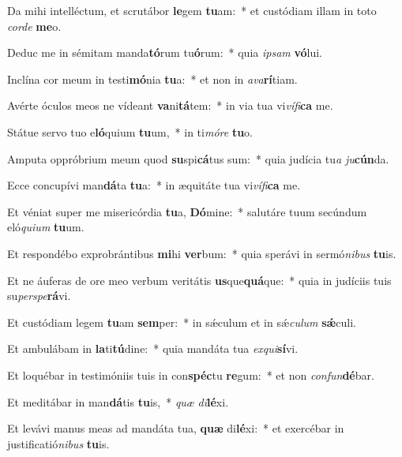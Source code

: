 \item Da mihi intelléctum, et scrutábor \textbf{le}gem \textbf{tu}am:~* et custódiam illam in toto \textit{cor}\textit{de} \textbf{me}o.
\item Deduc me in sémitam manda\textbf{tó}rum tu\textbf{ó}rum:~* quia \textit{ip}\textit{sam} \textbf{vó}lui.
\item Inclína cor meum in testi\textbf{mó}nia \textbf{tu}a:~* et non in \textit{a}\textit{va}\textbf{rí}tiam.
\item Avérte óculos meos ne vídeant \textbf{va}ni\textbf{tá}tem:~* in via tua vi\textit{ví}\textit{fi}\textbf{ca} me.
\item Státue servo tuo e\textbf{ló}quium \textbf{tu}um,~* in ti\textit{mó}\textit{re} \textbf{tu}o.
\item Amputa oppróbrium meum quod \textbf{su}spi\textbf{cá}tus sum:~* quia judícia tu\textit{a} \textit{ju}\textbf{cún}da.
\item Ecce concupívi man\textbf{dá}ta \textbf{tu}a:~* in æquitáte tua vi\textit{ví}\textit{fi}\textbf{ca} me.
\item Et véniat super me misericórdia \textbf{tu}a, \textbf{Dó}mine:~* salutáre tuum secúndum eló\textit{qui}\textit{um} \textbf{tu}um.
\item Et respondébo exprobrántibus \textbf{mi}hi \textbf{ver}bum:~* quia sperávi in sermó\textit{ni}\textit{bus} \textbf{tu}is.
\item Et ne áuferas de ore meo verbum veritátis \textbf{us}que\textbf{quá}que:~* quia in judíciis tuis su\textit{per}\textit{spe}\textbf{rá}vi.
\item Et custódiam legem \textbf{tu}am \textbf{sem}per:~* in sǽculum et in sǽ\textit{cu}\textit{lum} \textbf{sǽ}culi.
\item Et ambulábam in \textbf{la}ti\textbf{tú}dine:~* quia mandáta tua \textit{ex}\textit{qui}\textbf{sí}vi.
\item Et loquébar in testimóniis tuis in con\textbf{spéc}tu \textbf{re}gum:~* et non \textit{con}\textit{fun}\textbf{dé}bar.
\item Et meditábar in man\textbf{dá}tis \textbf{tu}is,~* \textit{quæ} \textit{di}\textbf{lé}xi.
\item Et levávi manus meas ad mandáta tua, \textbf{quæ} di\textbf{lé}xi:~* et exercébar in justificatió\textit{ni}\textit{bus} \textbf{tu}is.
